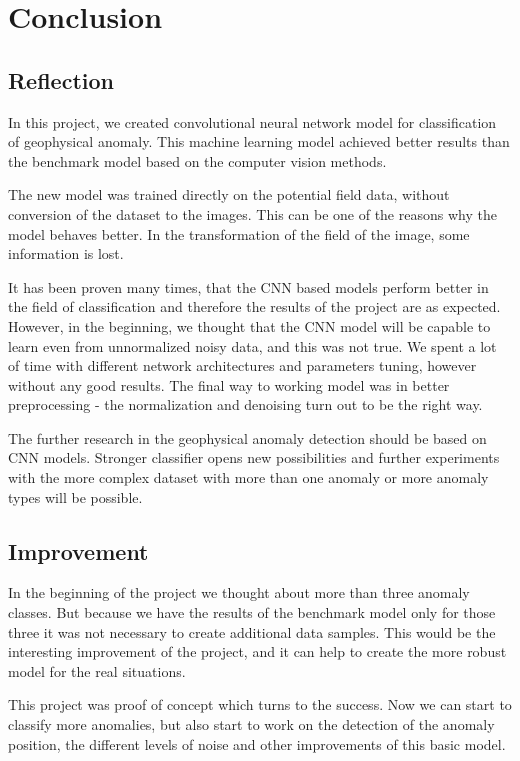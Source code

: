 \documentclass{article}
\begin{document}
\section{Conclusion}\label{conclusion}

\subsection{Reflection}\label{reflection}

In this project, we created convolutional neural network model for
classification of geophysical anomaly. This machine learning model
achieved better results than the benchmark model based on the computer
vision methods.

The new model was trained directly on the potential field data, without
conversion of the dataset to the images. This can be one of the reasons
why the model behaves better. In the transformation of the field of the
image, some information is lost.

It has been proven many times, that the CNN based models perform better
in the field of classification and therefore the results of the project
are as expected. However, in the beginning, we thought that the CNN
model will be capable to learn even from unnormalized noisy data, and
this was not true. We spent a lot of time with different network
architectures and parameters tuning, however without any good results.
The final way to working model was in better preprocessing - the
normalization and denoising turn out to be the right way.

The further research in the geophysical anomaly detection should be
based on CNN models. Stronger classifier opens new possibilities and
further experiments with the more complex dataset with more than one
anomaly or more anomaly types will be possible.

\subsection{Improvement}\label{improvement}

In the beginning of the project we thought about more than three anomaly
classes. But because we have the results of the benchmark model only for
those three it was not necessary to create additional data samples. This
would be the interesting improvement of the project, and it can help to
create the more robust model for the real situations.

This project was proof of concept which turns to the success. Now we can
start to classify more anomalies, but also start to work on the
detection of the anomaly position, the different levels of noise and
other improvements of this basic model.
\end{document}
